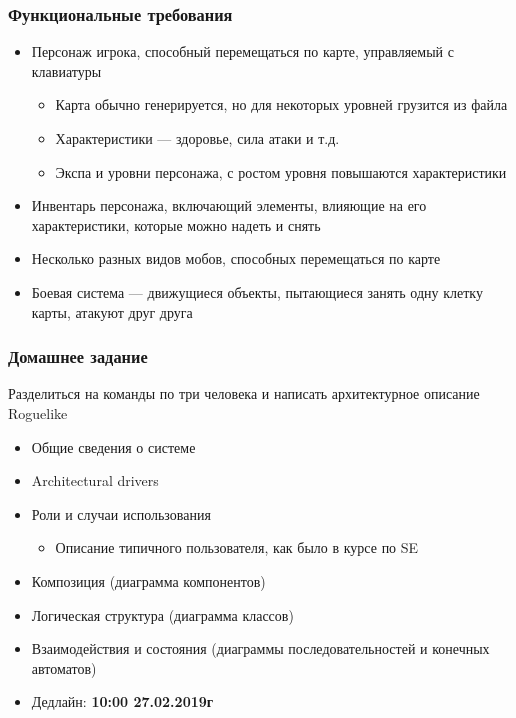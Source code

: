 \documentclass[xetex,mathserif,serif]{beamer}
\begin{document}
	\begin{frame}
		\frametitle{Функциональные требования}
		\begin{itemize}
			\item Персонаж игрока, способный перемещаться по карте, управляемый с клавиатуры
			\begin{itemize}
				\item Карта обычно генерируется, но для некоторых уровней грузится из файла
				\item Характеристики --- здоровье, сила атаки и т.д.
				\item Экспа и уровни персонажа, с ростом уровня повышаются характеристики
			\end{itemize}
			\item Инвентарь персонажа, включающий элементы, влияющие на его характеристики, которые можно надеть и снять
			\item Несколько разных видов мобов, способных перемещаться по карте
			\item Боевая система --- движущиеся объекты, пытающиеся занять одну клетку карты, атакуют друг друга
		\end{itemize}
	\end{frame}

	\begin{frame}
		\frametitle{Домашнее задание}
		Разделиться на команды по три человека и написать архитектурное описание Roguelike
		\begin{itemize}
			\item Общие сведения о системе
			\item Architectural drivers
			\item Роли и случаи использования
			\begin{itemize}
				\item Описание типичного пользователя, как было в курсе по SE
			\end{itemize}
			\item Композиция (диаграмма компонентов)
			\item Логическая структура (диаграмма классов)
			\item Взаимодействия и состояния (диаграммы последовательностей и конечных автоматов)
			\item Дедлайн: \textbf{10:00 27.02.2019г}
		\end{itemize}
	\end{frame}
\end{document}
